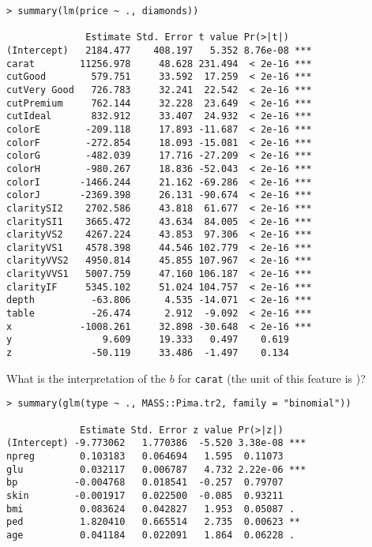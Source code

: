 \documentclass[12pt]{article}
\begin{document}
\begin{enumerate}


\begin{verbatim}
> summary(lm(price ~ ., diamonds))

              Estimate Std. Error t value Pr(>|t|)    
(Intercept)   2184.477    408.197   5.352 8.76e-08 ***
carat        11256.978     48.628 231.494  < 2e-16 ***
cutGood        579.751     33.592  17.259  < 2e-16 ***
cutVery Good   726.783     32.241  22.542  < 2e-16 ***
cutPremium     762.144     32.228  23.649  < 2e-16 ***
cutIdeal       832.912     33.407  24.932  < 2e-16 ***
colorE        -209.118     17.893 -11.687  < 2e-16 ***
colorF        -272.854     18.093 -15.081  < 2e-16 ***
colorG        -482.039     17.716 -27.209  < 2e-16 ***
colorH        -980.267     18.836 -52.043  < 2e-16 ***
colorI       -1466.244     21.162 -69.286  < 2e-16 ***
colorJ       -2369.398     26.131 -90.674  < 2e-16 ***
claritySI2    2702.586     43.818  61.677  < 2e-16 ***
claritySI1    3665.472     43.634  84.005  < 2e-16 ***
clarityVS2    4267.224     43.853  97.306  < 2e-16 ***
clarityVS1    4578.398     44.546 102.779  < 2e-16 ***
clarityVVS2   4950.814     45.855 107.967  < 2e-16 ***
clarityVVS1   5007.759     47.160 106.187  < 2e-16 ***
clarityIF     5345.102     51.024 104.757  < 2e-16 ***
depth          -63.806      4.535 -14.071  < 2e-16 ***
table          -26.474      2.912  -9.092  < 2e-16 ***
x            -1008.261     32.898 -30.648  < 2e-16 ***
y                9.609     19.333   0.497    0.619    
z              -50.119     33.486  -1.497    0.134    
\end{verbatim}

What is the interpretation of the $b$ for \texttt{carat} (the unit of this feature is )?



\vspace{-0.2cm}
\begin{verbatim}
> summary(glm(type ~ ., MASS::Pima.tr2, family = "binomial"))

             Estimate Std. Error z value Pr(>|z|)    
(Intercept) -9.773062   1.770386  -5.520 3.38e-08 ***
npreg        0.103183   0.064694   1.595  0.11073    
glu          0.032117   0.006787   4.732 2.22e-06 ***
bp          -0.004768   0.018541  -0.257  0.79707    
skin        -0.001917   0.022500  -0.085  0.93211    
bmi          0.083624   0.042827   1.953  0.05087 .  
ped          1.820410   0.665514   2.735  0.00623 ** 
age          0.041184   0.022091   1.864  0.06228 .  
\end{verbatim}


\end{enumerate}
\end{document}
